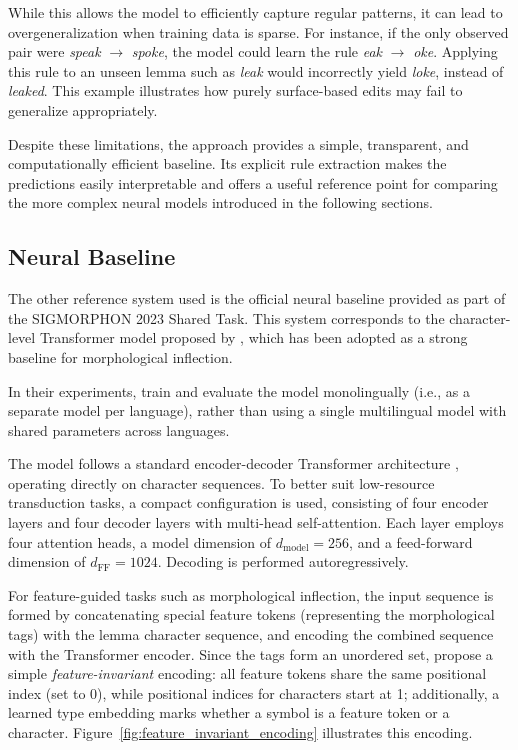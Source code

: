While this allows the model to efficiently capture regular patterns, it can lead to overgeneralization when training data is sparse. For instance, if the only observed pair were \textit{speak} $\rightarrow$ \textit{spoke}, the model could learn the rule \textit{eak} $\rightarrow$ \textit{oke}. Applying this rule to an unseen lemma such as \textit{leak} would incorrectly yield \textit{loke}, instead of \textit{leaked}. This example illustrates how purely surface-based edits may fail to generalize appropriately.

Despite these limitations, the approach provides a simple, transparent, and computationally efficient baseline. Its explicit rule extraction makes the predictions easily interpretable and offers a useful reference point for comparing the more complex neural models introduced in the following sections.

\subsection{Neural Baseline}
\label{sec:background-neural-baseline}

The other reference system used is the official neural baseline provided as part of the SIGMORPHON 2023 Shared Task. This system corresponds to the character-level Transformer model proposed by \textcite{wu-etal-2021-applying}, which has been adopted as a strong baseline for morphological inflection. 

In their experiments, \textcite{wu-etal-2021-applying} train and evaluate the model monolingually (i.e., as a separate model per language), rather than using a single multilingual model with shared parameters across languages.

The model follows a standard encoder-decoder Transformer architecture \parencite{vaswani2017attention}, operating directly on character sequences. To better suit low-resource transduction tasks, a compact configuration is used, consisting of four encoder layers and four decoder layers with multi-head self-attention. Each layer employs four attention heads, a model dimension of $d_{\mathrm{model}} = 256$, and a feed-forward dimension of $d_{\mathrm{FF}} = 1024$. Decoding is performed autoregressively.

For feature-guided tasks such as morphological inflection, the input sequence is formed by concatenating special feature tokens (representing the morphological tags) with the lemma character sequence, and encoding the combined sequence with the Transformer encoder. Since the tags form an unordered set, \textcite{wu-etal-2021-applying} propose a simple \emph{feature-invariant} encoding: all feature tokens share the same positional index (set to 0), while positional indices for characters start at 1; additionally, a learned type embedding marks whether a symbol is a feature token or a character. Figure~\ref{fig:feature_invariant_encoding} illustrates this encoding.

